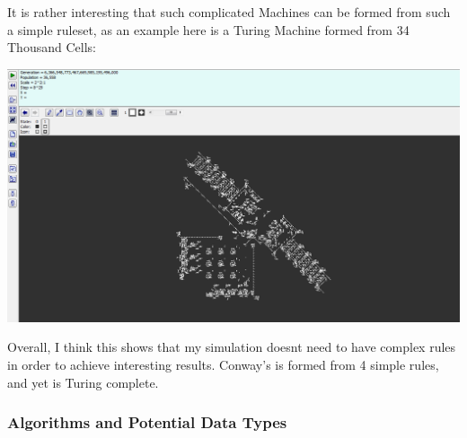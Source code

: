 \begin{flushleft}
                        \vspace{0.2cm}
                        It is rather interesting that such complicated Machines can be formed from such a simple ruleset, as an example 
                        here is a Turing Machine formed from 34 Thousand Cells: \\

                        \vspace{0.5cm}
                        \centerline{\includegraphics[width=14cm]{Images/InitialResearch/ConwaysTuringMachine.png}}
                        \vspace{0.2cm}

                        Overall, I think this shows that my simulation doesnt need to have complex rules in order to achieve 
                        interesting results. Conway's is formed from 4 simple rules, and yet is Turing complete.

                    \vspace{1cm}
                \subsubsection{Algorithms and Potential Data Types}
                    \large
                    \vspace{0.2cm}

\end{flushleft}

